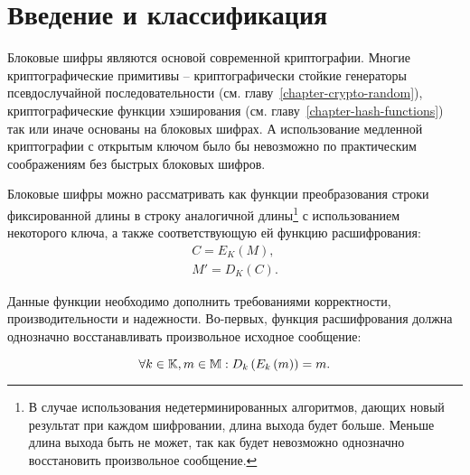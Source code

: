 \section{Введение и классификация}\label{section-block-ciphers-intro}

Блоковые шифры являются основой современной криптографии. Многие криптографические примитивы -- криптографически стойкие генераторы псевдослучайной последовательности (см. главу~\ref{chapter-crypto-random}), криптографические функции хэширования (см. главу~\ref{chapter-hash-functions}) так или иначе основаны на блоковых шифрах. А использование медленной криптографии с открытым ключом было бы невозможно по практическим соображениям без быстрых блоковых шифров.

Блоковые шифры можно рассматривать как функции преобразования строки фиксированной длины в строку аналогичной длины\footnote{В случае использования недетерминированных алгоритмов, дающих новый результат при каждом шифровании, длина выхода будет больше. Меньше длина выхода быть не может, так как будет невозможно однозначно восстановить произвольное сообщение.} с использованием некоторого ключа, а также соответствующую ей функцию расшифрования:
\[\begin{array}{l}
	C = E_K\left( M \right), \\
	M'= D_K\left( C \right).
\end{array}\]

Данные функции необходимо дополнить требованиями корректности, производительности и надежности. Во-первых, функция расшифрования должна однозначно восстанавливать произвольное исходное сообщение:

\[ \forall k \in \mathbb{K}, m \in \mathbb{M}: D_k \left( E_k\left( m \right) \right) = m. \]

